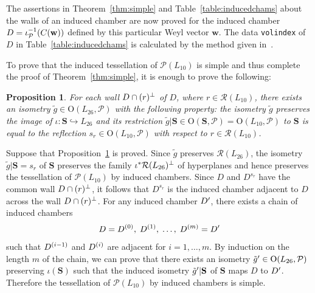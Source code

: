 \documentclass{amsart}
\newtheorem{proposition}[theorem]{Proposition}
\numberwithin{equation}{section}
\numberwithin{table}{section}
\numberwithin{figure}{section}
\newcommand{\PPP}{\mathord{\mathcal P}}
\newcommand{\RRR}{\mathord{\mathcal R}}
\newcommand{\inj}{\hookrightarrow}
\newcommand{\sprime}{\sp\prime}
\newcommand{\spar}[1]{\sp{(#1)}}
\newcommand{\sperp}{\sp{\perp}}
\newcommand{\inv}{\sp{-1}}
\newcommand{\OG}{\mathord{\mathrm{O}}}
\newcommand{\weyl}{\mathord{\mathbf w}}
\newcommand{\OGP}[1]{\OG(#1, \PPP)}
\renewcommand{\SS}{\mathbf{S}}
\begin{document}
%
\par
%
The assertions in Theorem~\ref{thm:simple} and Table~\ref{table:inducedchams}
about the walls of an induced chamber are now proved
for the induced chamber $D=\iota_{\PPP}\inv(C(\weyl))$
defined by this particular Weyl vector $\weyl$.
The data \texttt{volindex} of $D$ in Table~\ref{table:inducedchams}
is calculated by the method given in~\cite{ShimadaHessian}.
\par
To prove that
the induced tessellation of $\PPP(L_{10})$ is simple and thus complete the proof of Theorem~\ref{thm:simple},
it is enough to prove the following:
%
\begin{proposition}\label{prop:gtilde}
For each wall $D\cap (r)\sperp$ of $D$, where $r\in \RRR(L_{10})$,
there exists an isometry $\tilde{g}\in \OGP{L_{26}}$
with the following property:
the isometry $\tilde{g}$
preserves the image of $\iota\colon\SS\inj L_{26}$
and its restriction  $\tilde{g}|\SS\in \OGP{\SS}=\OGP{L_{10}}$ to $\SS$
is equal to  the reflection $s_r\in \OGP{L_{10}}$  with respect to
$r\in \RRR(L_{10})$.
\end{proposition}
%
Suppose that Proposition~\ref{prop:gtilde} is proved.
Since $\tilde{g}$ preserves $\RRR(L_{26})$,
the isometry $\tilde{g}|\SS=s_r$ of $\SS$ preserves 
the family $\iota\sp*\RRR(L_{26})\sperp$ of hyperplanes and hence preserves
the tessellation of $\PPP(L_{10})$ by induced chambers.
Since $D$ and $ D^{s_r}$ have the common wall $D\cap (r)\sperp$,
it follows that  $D^{s_r}$ is the induced chamber adjacent to $D$ across the wall $D\cap (r)\sperp$.
For any induced chamber  $D\sprime$,
there exists a chain of induced chambers
\[
D=D\spar{0}, \; D\spar{1}, \;\dots,\; D\spar{m}=D\sprime
\]
such that $D\spar{i-1}$ and $D\spar{i}$ are adjacent for $i=1, \dots, m$.
By induction on the length $m$ of the chain,
we can prove that there exists an isometry $\tilde{g}\sprime\in \OGP{L_{26}}$
preserving  $\iota(\SS)$
such that the induced isometry $\tilde{g}\sprime|\SS$ of $\SS$
maps $D$ to $D\sprime$.
Therefore the tessellation of $\PPP(L_{10})$ by induced chambers is simple.
%
%
\end{document}

